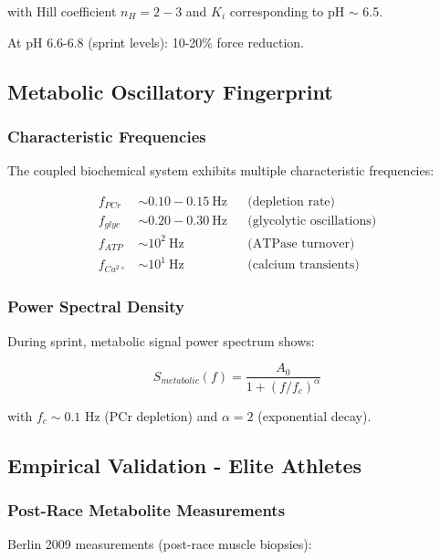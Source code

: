 with Hill coefficient $n_H = 2-3$ and $K_i$ corresponding to pH $\sim$ 6.5.

At pH 6.6-6.8 (sprint levels): 10-20\% force reduction.

\subsection{Metabolic Oscillatory Fingerprint}

\subsubsection{Characteristic Frequencies}

The coupled biochemical system exhibits multiple characteristic frequencies:

\begin{align}
f_{PCr} &\sim 0.10-0.15~\text{Hz} && \text{(depletion rate)} \\
f_{glyc} &\sim 0.20-0.30~\text{Hz} && \text{(glycolytic oscillations)} \\
f_{ATP} &\sim 10^2~\text{Hz} && \text{(ATPase turnover)} \\
f_{Ca^{2+}} &\sim 10^1~\text{Hz} && \text{(calcium transients)}
\end{align}

\subsubsection{Power Spectral Density}

During sprint, metabolic signal power spectrum shows:

\begin{equation}
S_{metabolic}(f) = \frac{A_0}{1 + (f/f_c)^{\alpha}}
\label{eq:metabolic_spectrum}
\end{equation}

with $f_c \sim 0.1$ Hz (PCr depletion) and $\alpha = 2$ (exponential decay).

\subsection{Empirical Validation - Elite Athletes}

\subsubsection{Post-Race Metabolite Measurements}

Berlin 2009 measurements (post-race muscle biopsies):

